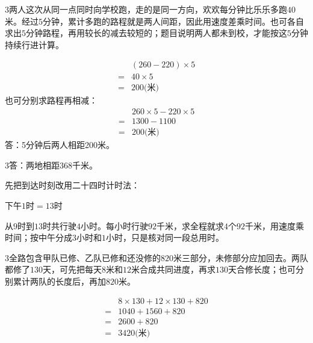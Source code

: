 \documentclass[multi=snippet,border={5bp 20bp 5bp 5bp}]{standalone}
\newenvironment{snippet}[3]{\begin{minipage}{#1bp}\color{answerred}\fontsize{#2}{#3}\selectfont\raggedright}{\end{minipage}}
\begin{document}
\begin{snippet}{505}{11.5}{14}\begin{multicols}{3}\raggedcolumns 两人这次从同一点同时向学校跑，走的是同一方向，欢欢每分钟比乐乐多跑\(40\)\allowbreak 米。经过\(5\)\allowbreak 分钟，累计多跑的路程就是两人间距，因此用速度差乘时间。也可各自求出\(5\)\allowbreak 分钟路程，再用较长的减去较短的；题目说明两人都未到校，才能按这\(5\)\allowbreak 分钟持续行进计算。\par \[\begin{aligned}&(260-220)\times5\\={}&40\times5\\={}&200\text{(米)}\end{aligned}\]也可分别求路程再相减：\[\begin{aligned}&260\times5-220\times5\\={}&1300-1100\\={}&200\text{(米)}\end{aligned}\]答：5分钟后两人相距200米。\end{multicols}\end{snippet}
\begin{snippet}{505}{11.5}{14}\begin{multicols}{3}\raggedcolumns 答：两地相距368千米。\par 先把到达时刻改用二十四时计时法：\par\noindent\(\displaystyle \text{下午}1\text{时}=13\text{时}\)\allowbreak \par 从\(9\)\allowbreak 时到\(13\)\allowbreak 时共行驶\(4\)\allowbreak 小时。每小时行驶\(92\)\allowbreak 千米，求全程就求\(4\)\allowbreak 个\(92\)\allowbreak 千米，用速度乘时间；按中午分成\(3\)\allowbreak 小时和\(1\)\allowbreak 小时，只是核对同一段总用时。\end{multicols}\end{snippet}
\begin{snippet}{505}{11.5}{14}\begin{multicols}{3}\raggedcolumns 全路包含甲队已修、乙队已修和还没修的\(820\)\allowbreak 米三部分，未修部分应加回去。两队都修了\(130\)\allowbreak 天，可先把每天\(8\)\allowbreak 米和\(12\)\allowbreak 米合成共同进度，再求\(130\)\allowbreak 天合修长度；也可分别累计两队的长度后，再加\(820\)\allowbreak 米。\par \[\begin{aligned}&8\times130+12\times130+820\\={}&1040+1560+820\\={}&2600+820\\={}&3420\text{(米)}\end{aligned}\]\end{multicols}\end{snippet}
\end{document}
